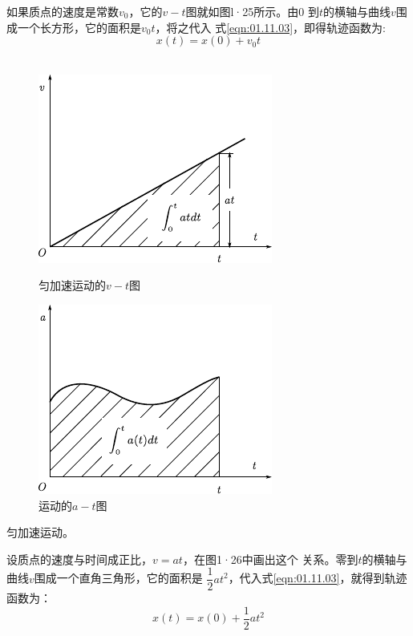 如果质点的速度是常数$v_0$，它的$v-t$图就如图l·25所示。由0
到$t$的横轴与曲线$v$围成一个长方形，它的面积是$v_0t$，将之代入
式\eqref{eqn:01.11.03}，即得轨迹函数为:
\begin{equation}\label{eqn:01.11.04}
    x(t)=x(0)+v_0 t
\end{equation}
~\vspace{-1.5em}
\begin{figure}[!h]
    \begin{minipage}[b]{14em}
        \centering
        \includegraphics{figure/fig01.26}
        \caption{匀加速运动的$v-t$图}
        \label{fig:01.26}
    \end{minipage}\hfill
    \begin{minipage}[b]{14em}
        \centering
        \includegraphics{figure/fig01.27}
        \caption{运动的$a-t$图}
        \label{fig:01.27}
    \end{minipage}
\end{figure}

  \vspace{-1em}\example 匀加速运动。

  设质点的速度与时间成正比，$v=at$，在图1·26中画出这个
关系。零到$t$的横轴与曲线$v$围成一个直角三角形，它的面积是
$\dfrac{1}{2} a t^2$，代入式\eqref{eqn:01.11.03}，就得到轨迹函数为：
\begin{equation*}\label{eqn:01.11.04i}
    x(t)=x(0)+\frac{1}{2}at^2 \tag{1.11.4$'$}
\end{equation*}

